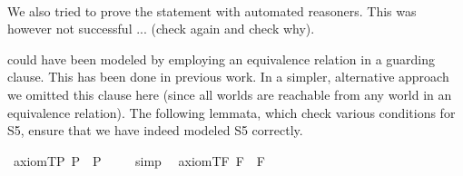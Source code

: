 \begin{isabellebody}
\endisatagproof
{\isafoldproof}%
%
\isadelimproof
%
\endisadelimproof
\ \isamarkupfalse%
%
\isadelimproof
\ %
\endisadelimproof
%
\isatagproof
{}\isamarkupfalse%
\ %
%
\endisatagproof
{\isafoldproof}%
%
\isadelimproof
%
\endisadelimproof
%
\begin{isamarkuptext}%
We also tried to prove the statement  with automated reasoners.
 This was however not successful ... (check again and check why).%
\end{isamarkuptext}%
\isamarkuptrue%
%
\isamarkuptrue%
%
\begin{isamarkuptext}%
\isa{{\isasymbox}} could have been modeled by employing an equivalence relation  in a 
 guarding clause. This has been done in previous work. In a simpler, alternative approach we omitted 
 this clause here (since all worlds are reachable from any world in an equivalence relation). The 
 following lemmata, which check various conditions for S5,  ensure that we have indeed 
 modeled S5 correctly.%
\end{isamarkuptext}%
\isamarkuptrue%
\isamarkupfalse%
\ axiom{\isacharunderscore}T{\isacharunderscore}P{\isacharcolon}\ {\isachardoublequoteopen}{\isacharbrackleft}\isactrlbold {\isasymbox}{\isacharparenleft}{\isasymphi}\isactrlsup P{\isacharparenright}\ \isactrlbold {\isasymrightarrow}\ {\isacharparenleft}{\isasymphi}\isactrlsup P{\isacharparenright}{\isacharbrackright}\ {\isacharequal}\ {\isasymtop}{\isachardoublequoteclose}%
\isadelimproof
\ %
\endisadelimproof
%
\isatagproof
{}\isamarkupfalse%
\ simp\ \isamarkupfalse%
%
\endisatagproof
{\isafoldproof}%
%
\isadelimproof
%
\endisadelimproof
\isanewline
{}\isamarkupfalse%
\ axiom{\isacharunderscore}T{\isacharunderscore}F{\isacharcolon}\ {\isachardoublequoteopen}{\isacharbrackleft}\isactrlbold {\isasymbox}{\isacharparenleft}{\isasymphi}\isactrlsup F{\isacharparenright}\ \isactrlbold {\isasymrightarrow}\ {\isacharparenleft}{\isasymphi}\isactrlsup F{\isacharparenright}{\isacharbrackright}\ {\isacharequal}\ {\isasymtop}{\isachardoublequoteclose}%
\isadelimproof
\ %
\endisadelimproof
%
\isatagproof
{}\isamarkupfalse%

\end{isabellebody}
